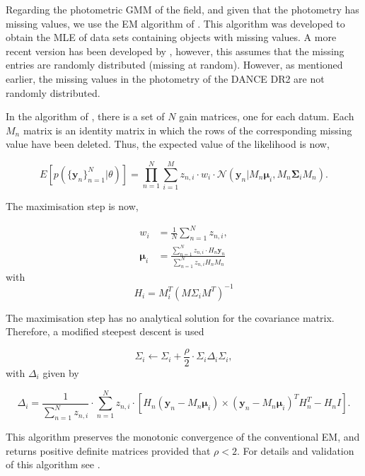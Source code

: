 Regarding the photometric GMM of the field, and given that the photometry has missing values, we use the EM algorithm of \citet{McMichael1996}. This algorithm was developed to obtain the MLE of data sets containing objects with missing values. A more recent version has been developed by \citet{Lin2006}, however, this assumes that the missing entries are randomly distributed (missing at random). However,  as mentioned earlier, the missing values in the photometry of the DANCE DR2 are not randomly distributed.

In the algorithm of \citet{McMichael1996}, there is a set of $N$ gain matrices, one for each datum. Each $M_n$ matrix is an identity matrix in which the rows of the corresponding missing value have been deleted. Thus, the expected value of the likelihood is now,

\begin{equation}
E[p(\{\mathbf{y}_n\}_{n=1}^N|\theta)]=\prod_{n=1}^N {\sum_{i=1} ^M {z_{n,i}\cdot w_i\cdot \mathcal{N}(\mathbf{y}_n|M_n \boldsymbol{\mu}_i,M_n\boldsymbol{\Sigma}_i M_n)}}.
\end{equation}

The maximisation step is now,

\begin{align}
w_i &= \frac{1}{N} \sum_{n=1}^N z_{n,i}, \\
\boldsymbol{\mu}_i &= \frac{ \sum_{n=1}^N z_{n,i}\cdot H_n \mathbf{y}_n}{\sum_{n=1}^N z_{n,i} H_n M_n}
\end{align}
with 
\begin{equation}
H_i=M_i^T(M\Sigma_i M^T)^{-1}
\end{equation}

The maximisation step has no analytical solution for the covariance matrix. Therefore, a modified steepest descent is used

\begin{equation}
\Sigma_i \leftarrow \Sigma_i + \frac{\rho}{2}\cdot \Sigma_i\Delta_i\Sigma_i,
\end{equation}
with $\Delta_i$ given by

\begin{equation}
\Delta_i=  \frac{1}{\sum_{n=1}^N z_{n,i}}\cdot \sum_{n=1}^N z_{n,i} \cdot \left[H_n(\mathbf{y}_n -  M_n \boldsymbol{\mu}_i) \times  (\mathbf{y}_n -  M_n \boldsymbol{\mu}_i)^TH_n^T - H_nI\right].
\end{equation}
 
 This algorithm preserves the monotonic convergence of the conventional EM, and returns positive definite matrices provided that $\rho < 2$. For details and validation of this algorithm see \citet{McMichael1996}.

